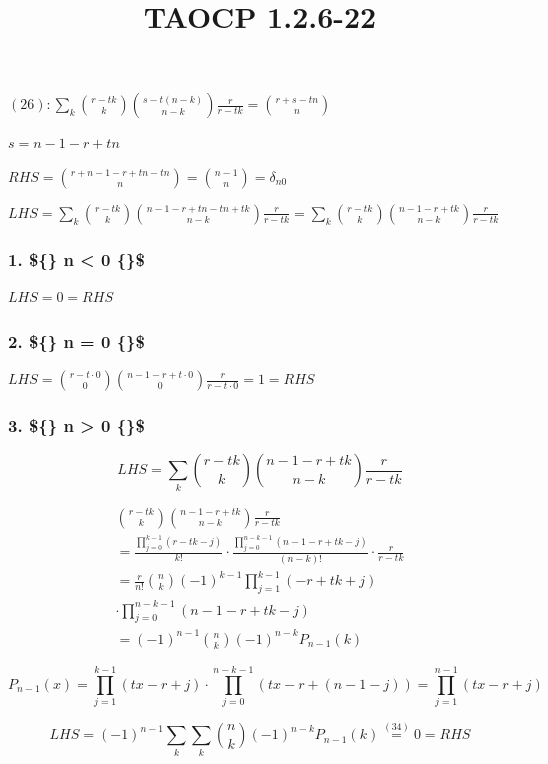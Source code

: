 \documentclass{article}
\title{TAOCP 1.2.6\mbox{-}22}
\begin{document}
\maketitle

\( (26): \sum_{k} \binom{r-tk}{k}\binom{s-t(n-k)}{n-k}\frac{r}{r-tk} = \binom{r+s-tn}{n} \)

\( s = n - 1 - r + tn \)

\( RHS = \binom{r+n-1-r+tn-tn}{n} = \binom{n-1}{n} = \delta_{n0} \)

\( LHS = \sum_{k} \binom{r-tk}{k}\binom{n-1-r + tn - tn + tk}{n-k}\frac{r}{r-tk} = \sum_{k} \binom{r-tk}{k}\binom{n - 1 - r + tk}{n-k}\frac{r}{r-tk} \)

\subsubsection*{1. \$\{\} n < 0 \{\}\$}

\( LHS=0=RHS \)

\subsubsection*{2. \$\{\} n = 0 \{\}\$}

\( LHS = \binom{r-t\cdot 0}{0}\binom{n-1-r+t\cdot 0}{0}\frac{r}{r-t\cdot 0} = 1 = RHS \)

\subsubsection*{3. \$\{\} n > 0 \{\}\$}

\[ LHS = \sum_{k} \binom{r-tk}{k}\binom{n - 1 - r + tk}{n-k}\frac{r}{r-tk} \]

\begin{multline*}
\binom{r-tk}{k}\binom{n - 1 - r + tk}{n-k}\frac{r}{r-tk} \\
= \frac{\prod_{j=0}^{k-1}(r-tk-j)}{k!} \cdot \frac{\prod_{j=0}^{n-k-1} (n-1-r+tk-j)}{(n-k)!} \cdot \frac{r}{r-tk} \\
= \frac{r}{n!} \binom{n}{k} {(-1)}^{k-1} \prod_{j=1}^{k-1} (-r+tk+j) \\
\cdot \prod_{j=0}^{n-k-1} (n-1-r+tk-j) \\
= {(-1)}^{n-1} \binom{n}{k} {(-1)}^{n-k} P_{n-1}(k)
\end{multline*}

\[ P_{n-1}(x) = \prod_{j=1}^{k-1}(tx - r + j) \cdot \prod_{j=0}^{n-k-1}(tx - r + (n - 1 - j)) = \prod_{j=1}^{n - 1}(tx-r + j) \]

\[ LHS = {(-1)}^{n-1}\sum_{k} \sum_{k} \binom{n}{k}{(-1)}^{n-k} P_{n-1}(k) \overset{(34)}{=} 0 = RHS \]
\end{document}
